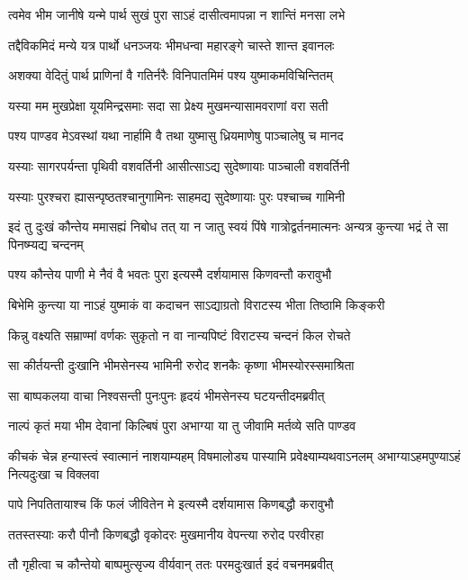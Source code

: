 \twolineshloka
{त्वमेव भीम जानीषे यन्मे पार्थ सुखं पुरा}
{साऽहं दासीत्वमापन्ना न शान्तिं मनसा लभे}


\twolineshloka
{तद्दैविकमिदं मन्ये यत्र पार्थो धनञ्जयः}
{भीमधन्वा महारङ्गे चास्ते शान्त इवानलः}


\twolineshloka
{अशक्या वेदितुं पार्थ प्राणिनां वै गतिर्नरैः}
{विनिपातमिमं पश्य युष्माकमविचिन्तितम्}


\twolineshloka
{यस्या मम मुखप्रेक्षा यूयमिन्द्रसमाः सदा}
{सा प्रेक्ष्य मुखमन्यासामवराणां वरा सती}


\twolineshloka
{पश्य पाण्डव मेऽवस्थां यथा नार्हामि वै तथा}
{युष्मासु ध्रियमाणेषु पाञ्चालेषु च मानद}


\twolineshloka
{यस्याः सागरपर्यन्ता पृथिवी वशवर्तिनी}
{आसीत्साऽद्य सुदेष्णायाः पाञ्चाली वशवर्तिनी}


\twolineshloka
{यस्याः पुरश्चरा ह्यासन्पृष्ठतश्चानुगामिनः}
{साहमद्य सुदेष्णायाः पुरः पश्चाच्च गामिनी}


\threelineshloka
{इदं तु दुःखं कौन्तेय ममासह्यं निबोध तत्}
{या न जातु स्वयं पिंषे गात्रोद्वर्तनमात्मनः}
{अन्यत्र कुन्त्या भद्रं ते सा पिनष्म्यद्य चन्दनम्}


\twolineshloka
{पश्य कौन्तेय पाणी मे नैवं वै भवतः पुरा}
{इत्यस्मै दर्शयामास किणवन्तौ करावुभौ}


\twolineshloka
{बिभेमि कुन्त्या या नाऽहं युष्माकं वा कदाचन}
{साऽद्याग्रतो विराटस्य भीता तिष्ठामि किङ्करी}


\twolineshloka
{किन्नु वक्ष्यति सम्राण्मां वर्णकः सुकृतो न वा}
{नान्यपिष्टं विराटस्य चन्दनं किल रोचते}



\twolineshloka
{सा कीर्तयन्ती दुःखानि भीमसेनस्य भामिनी}
{रुरोद शनकैः कृष्णा भीमस्योरस्समाश्रिता}


\twolineshloka
{सा बाष्पकलया वाचा निश्वसन्ती पुनःपुनः}
{हृदयं भीमसेनस्य घटयन्तीदमब्रवीत्}


\twolineshloka
{नाल्पं कृतं मया भीम देवानां किल्बिषं पुरा}
{अभाग्या या तु जीवामि मर्तव्ये सति पाण्डव}


\threelineshloka
{कीचकं चेन्न हन्यास्त्वं स्वात्मानं नाशयाम्यहम्}
{विषमालोड्य पास्यामि प्रवेक्ष्याम्यथवाऽनलम्}
{अभाग्याऽहमपुण्याऽहं नित्यदुःखा च विक्लवा}


\twolineshloka
{पापे निपतितायाश्च किं फलं जीवितेन मे}
{इत्यस्मै दर्शयामास किणबद्धौ करावुभौ}


\twolineshloka
{ततस्तस्याः करौ पीनौ किणबद्धौ वृकोदरः}
{मुखमानीय वेपन्त्या रुरोद परवीरहा}


\twolineshloka
{तौ गृहीत्वा च कौन्तेयो बाष्पमुत्सृज्य वीर्यवान्}
{ततः परमदुःखार्त इदं वचनमब्रवीत्}

